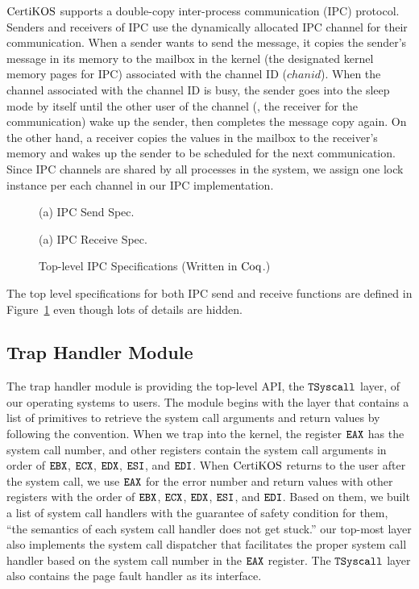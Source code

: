 $\mathrm{CertiKOS}$ supports a double-copy inter-process communication (IPC) protocol.
Senders and receivers of IPC use the dynamically allocated IPC channel for their communication. 
When a sender wants to send the message, 
it copies the sender's message in its memory to the mailbox in the kernel (the designated kernel memory pages for IPC) associated with the channel ID ($chanid$).
When the channel associated with the channel ID is busy, the sender goes into the sleep mode by itself until the other user of the channel
(\ie, the receiver for the communication) wake up the sender, then completes the message copy again. 
On the other hand, a receiver copies the values in the mailbox to the receiver's memory and wakes up the sender to be scheduled for the next communication. 
Since IPC channels are shared by all processes in the system, 
we assign one lock instance per each channel in our IPC implementation.
 \begin{figure}
\begin{center}

(a) IPC Send Spec.
 
(a) IPC Receive Spec.
\end{center}
\caption{Top-level IPC Specifications (Written in $\mathrm{Coq}$.)}
\label{fig:chapter:certikos:ipc-specs}
\end{figure}
The top level specifications for both IPC send and receive functions are defined in Figure~\ref{fig:chapter:certikos:ipc-specs}
even though lots of details are hidden. 


\subsection{Trap Handler Module}
\label{chapter:certikos:subsec:trap-handler-module}

The trap handler module is providing the top-level API, the ${{\mathrm{\texttt{TSyscall}}}}$ layer, of our operating systems to users.  
The module begins with the layer that contains a list of primitives to retrieve the system call arguments and return values
by following the convention.
When we trap into the kernel, the register ${\mathrm{\texttt{EAX}}}$ has the system call number, and other registers contain the system call arguments in order of ${\mathrm{\texttt{EBX}}}$, ${\mathrm{\texttt{ECX}}}$, ${\mathrm{\texttt{EDX}}}$, ${\mathrm{\texttt{ESI}}}$, and ${\mathrm{\texttt{EDI}}}$. 
When $\mathrm{CertiKOS}$ returns to the user after the system call, we use ${\mathrm{\texttt{EAX}}}$ for the error number and 
return values with other registers with the order of 
 ${\mathrm{\texttt{EBX}}}$, ${\mathrm{\texttt{ECX}}}$, ${\mathrm{\texttt{EDX}}}$, ${\mathrm{\texttt{ESI}}}$, and ${\mathrm{\texttt{EDI}}}$. 
Based on them, 
we built a list of system call handlers with the guarantee of safety condition for them, 
``the semantics of each system call handler does not get stuck.'' 
our top-most layer also implements the system call dispatcher that facilitates the proper system call handler based on the system call number in the ${\mathrm{\texttt{EAX}}}$ register.
The ${{\mathrm{\texttt{TSyscall}}}}$ layer also contains the page fault handler as its interface.

